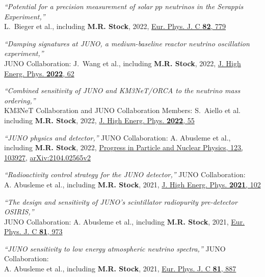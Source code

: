 \documentclass[letterpaper,12pt, oneside]{article}
\begin{document}
\begin{etaremune}[leftmargin=1.65em]
\item \textit{“Potential for a precision measurement of solar $pp$ neutrinos in the Serappis Experiment,”}\\ L.~Bieger et al., including \textbf{M.R. Stock}, 2022, \href{https://doi.org/10.1140/epjc/s10052-022-10725-y}{Eur. Phys. J. C \textbf{82}, 779}

\item \textit{“Damping signatures at JUNO, a medium-baseline reactor neutrino oscillation experiment,”}\\ JUNO Collaboration: J.~Wang et al., including \textbf{M.R. Stock}, 2022, \href{https://doi.org/10.1007/JHEP06(2022)062}{J. High Energ. Phys. \textbf{2022}, 62}

\item \textit{“Combined sensitivity of JUNO and KM3NeT/ORCA to the neutrino mass ordering,”} \\ KM3NeT Collaboration and JUNO Collaboration Members: S.~Aiello et al.\\  including \textbf{M.R. Stock}, 2022, \href{https://doi.org/10.1007/JHEP03(2022)055}{J. High Energ. Phys. \textbf{2022}, 55}

\item \textit{“JUNO physics and detector,”} JUNO Collaboration: A. Abusleme et al., including \textbf{M.R. Stock}, 2022, \href{https://doi.org/10.1016%2Fj.ppnp.2021.103927}{Progress in Particle and Nuclear Physics, 123, 103927}, \href{https://arxiv.org/abs/2104.02565v2}{arXiv:2104.02565v2}

\item \textit{“Radioactivity control strategy for the JUNO detector,”} JUNO Collaboration: \\ A. Abusleme et al., including \textbf{M.R. Stock}, 2021, \href{https://doi.org/10.1007/JHEP11(2021)102}{J. High Energ. Phys. \textbf{2021}, 102}

\item \textit{“The design and sensitivity of JUNO’s scintillator radiopurity pre-detector OSIRIS,”} \\ JUNO Collaboration: A. Abusleme et al., including \textbf{M.R. Stock}, 2021, \href{https://doi.org/10.1140/epjc/s10052-021-09544-4}{Eur. Phys. J. C \textbf{81}, 973}

\item \textit{“JUNO sensitivity to low energy atmospheric neutrino spectra,”} JUNO Collaboration: \\ A. Abusleme et al., including \textbf{M.R. Stock}, 2021, \href{https://doi.org/10.1140/epjc/s10052-021-09565-z}{Eur. Phys. J. C \textbf{81}, 887}


\end{etaremune}
\end{document}
